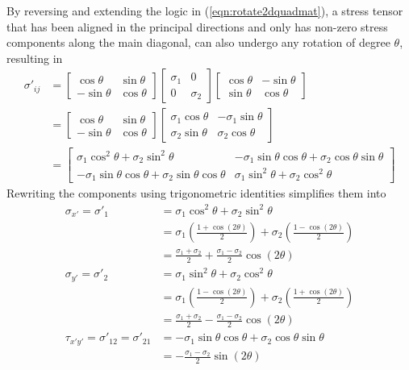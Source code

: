 By reversing and extending the logic in (\ref{eqn:rotate2dquadmat}), a stress tensor that has been aligned in the principal directions and only has non-zero stress components along the main diagonal, can also undergo any rotation of degree $\theta$, resulting in
\begin{align}
\sigma'_{ij} &= 
\begin{bmatrix}
\cos \theta & \sin \theta \\
-\sin \theta & \cos \theta
\end{bmatrix}
\begin{bmatrix}
\sigma_1 & 0 \\
0 & \sigma_2 
\end{bmatrix}
\begin{bmatrix}
\cos \theta & -\sin \theta \\
\sin \theta & \cos \theta
\end{bmatrix} \nonumber \\
&=
\begin{bmatrix}
\cos \theta & \sin \theta \\
-\sin \theta & \cos \theta
\end{bmatrix}
\begin{bmatrix}
\sigma_1\cos \theta & -\sigma_1\sin \theta \\
\sigma_2\sin \theta & \sigma_2\cos \theta
\end{bmatrix} \nonumber \\
&=
\begin{bmatrix}
\sigma_1\cos^2 \theta + \sigma_2\sin^2\theta & -\sigma_1\sin \theta \cos\theta + \sigma_2\cos \theta\sin\theta \\
-\sigma_1\sin \theta\cos\theta + \sigma_2\sin\theta\cos\theta & \sigma_1\sin^2\theta + \sigma_2\cos^2 \theta
\end{bmatrix}
\end{align}
Rewriting the components using trigonometric identities simplifies them into
\begin{subequations}
\begin{align}
\sigma_{x'} = \sigma'_1 &= \sigma_1\cos^2 \theta + \sigma_2\sin^2\theta \nonumber \\
&= \sigma_1(\frac{1+\cos(2\theta)}{2}) + \sigma_2(\frac{1-\cos(2\theta)}{2}) \nonumber \\
&= \frac{\sigma_1 + \sigma_2}{2} + \frac{\sigma_1 - \sigma_2}{2}\cos(2\theta) \label{eqn:mohrnormal1} \\
\sigma_{y'} = \sigma'_2 &= \sigma_1\sin^2 \theta + \sigma_2\cos^2\theta \nonumber \\
&= \sigma_1(\frac{1-\cos(2\theta)}{2}) + \sigma_2(\frac{1+\cos(2\theta)}{2}) \nonumber \\
&= \frac{\sigma_1 + \sigma_2}{2} - \frac{\sigma_1 - \sigma_2}{2}\cos(2\theta) \label{eqn:mohrnormal2} \\
\tau_{x'y'} = \sigma'_{12} = \sigma'_{21} &= -\sigma_1\sin \theta \cos\theta + \sigma_2\cos \theta\sin\theta \nonumber \\
&= -\frac{\sigma_1 - \sigma_2}{2} \sin(2\theta) \label{eqn:mohrshear}
\end{align} 
\end{subequations}
